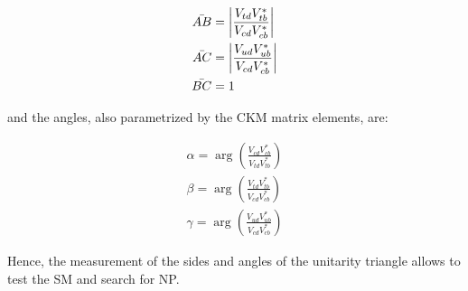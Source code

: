 \begin{align}
    \Bar{AB} &= \abs{\frac{V_{td}V_{tb}^*}{V_{cd}V_{cb}^*}} \\
    \Bar{AC} &= \abs{\frac{V_{ud}V_{ub}^*}{V_{cd}V_{cb}^*}} \\
    \Bar{BC} &= 1
\end{align}

and the angles, also parametrized by the \gls{CKM} matrix elements, are:

\begin{align}
    \alpha = \arg\left(\frac{V_{cd}V_{cb}^*}{V_{td}V_{tb}^*}\right) \\
    \beta =  \arg\left(\frac{V_{td}V_{tb}^*}{V_{cd}V_{cb}^*}\right) \\
    \gamma = \arg\left(\frac{V_{ud}V_{ub}^*}{V_{cd}V_{cb}^*}\right)
\end{align}

Hence, the measurement of the sides and angles of the unitarity triangle allows to test the \gls{SM} and search for \gls{NP}.
